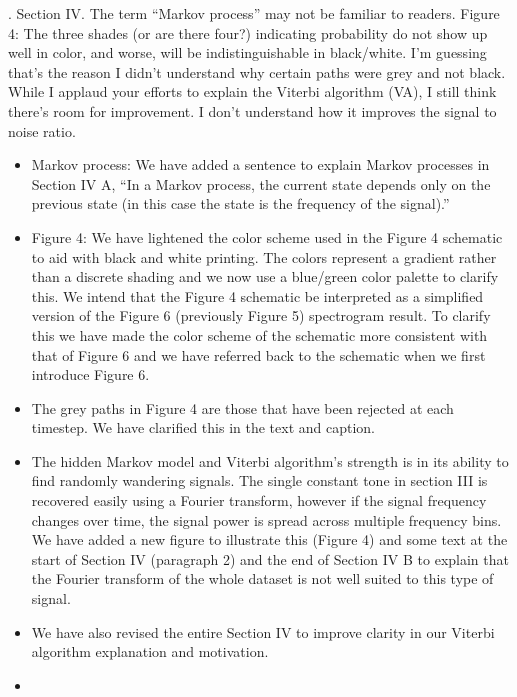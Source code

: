 \documentclass{article}
\begin{document}
. Section IV.  The term “Markov process” may not be familiar to readers.  Figure 4: The three shades (or are there four?) indicating probability do not show up well in color, and worse, will be indistinguishable in black/white.  I’m guessing that’s the reason I didn’t understand why certain paths were grey and not black.  While I applaud your efforts to explain the Viterbi algorithm (VA), I still think there’s room for improvement.  I don’t understand how it improves the signal to noise ratio. 
\begin{itemize}
\item Markov process: We have added a sentence to explain Markov processes in Section IV A, ``In a Markov process, the current state depends only on the previous state (in this case the state is the frequency of the signal).''
\item Figure 4: We have lightened the color scheme used in the Figure 4 schematic to aid with black and white printing. The colors represent a gradient rather than a discrete shading and we now use a blue/green color palette to clarify this. We intend that the Figure 4 schematic be interpreted as a simplified version of the Figure 6 (previously Figure 5) spectrogram result. To clarify this we have made the color scheme of the schematic more consistent with that of Figure 6 and we have referred back to the schematic when we first introduce Figure 6. 
\item The grey paths in Figure 4 are those that have been rejected at each timestep. We have clarified this in the text and caption. 
\item The hidden Markov model and Viterbi algorithm's strength is in its ability to find randomly wandering signals. The single constant tone in section III is recovered easily using a Fourier transform, however if the signal frequency changes over time, the signal power is spread across multiple frequency bins. We have added a new figure to illustrate this (Figure 4) and some text at the start of Section IV (paragraph 2) and the end of Section IV B to explain that the Fourier transform of the whole dataset is not well suited to this type of signal.
\item We have also revised the entire Section IV to improve clarity in our Viterbi algorithm explanation and motivation.
\item[]
\end{itemize}
\end{document}
